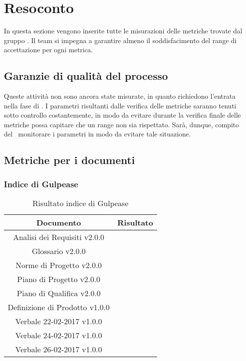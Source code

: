 \section{Resoconto}

In questa sezione vengono inserite tutte le misurazioni delle metriche trovate dal gruppo \gruppo.
Il team si impegna a garantire almeno il soddisfacimento del range di accettazione per ogni metrica.


\subsection{Garanzie di qualità del processo}

Queste attività non sono ancora state misurate, in quanto richiedono l'entrata nella fase di \COD. I parametri risultanti dalle verifica delle metriche saranno tenuti sotto controllo costantemente, in modo da evitare durante la verifica finale delle metriche possa capitare che un range non sia rispettato. Sarà, dunque, compito del \Ver\ monitorare i parametri in modo da evitare tale situazione.

\subsection{Metriche per i documenti}

\subsubsection{Indice di Gulpease}

\begin{table}[h]
	\begin{center}
		\begin{tabular}{|c|c|}
			\hline
			\textbf{Documento}	& \textbf{Risultato} \\
			\hline
			Analisi dei Requisiti v2.0.0 &	\\
			\hline
			Glossario v2.0.0 &	\\
			\hline
			Norme di Progetto v2.0.0 &	\\
			\hline
			Piano di Progetto v2.0.0	&	\\
			\hline
			Piano di Qualifica v2.0.0	&	\\
			\hline
			Definizione di Prodotto v1.0.0	&	\\
			\hline
			Verbale 22-02-2017 v1.0.0	&	\\
			\hline
			Verbale 24-02-2017 v1.0.0	&	\\
			\hline
			Verbale 26-02-2017 v1.0.0	&	\\
			\hline
		\end{tabular}
	\end{center}
	\caption{Risultato indice di Gulpease}
\end{table}

